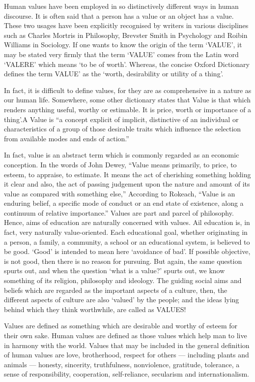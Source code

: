 Human values have been employed in so distinctively different ways in human discourse. It is
often said that a person has a value or an object has a value. These two usages have been
explicitly recognised by writers in various disciplines such as Charles Mortris in Philosophy,
Brevster Smith in Psychology and Roibin Williams in Sociology.
If one wants to know the origin of the term ‘VALUE’, it may be stated very firmly that the term
‘VALUE’ comes from the Latin word ‘VALERE’ which means ‘to be of worth’. Whereas, the
concise Oxford Dictionary defines the term VALUE’ as the ‘worth, desirability or utility of a
thing’.


In fact, it is difficult to define values, for they are as comprehensive in a nature as our human
life. Somewhere, some other dictionary states that Value is that which renders anything useful,
worthy or estimable. It is price, worth or importance of a thing’.A
Value is “a concept explicit of implicit, distinctive of an individual or characteristics of a group
of those desirable traits which influence the selection from available modes and ends of
action.”


In fact, value is an abstract term which is commonly regarded as an economic conception. In
the words of John Dewey, “Value means primarily, to price, to esteem, to appraise, to estimate.
It means the act of cherishing something holding it clear and also, the act of passing judgement
upon the nature and amount of its value as compared with something else,”
According to Rokeach, “Value is an enduring belief, a specific mode of conduct or an end state
of existence, along a continuum of relative importance.”
Values are part and parcel of philosophy. Hence, aims of education are naturally concerned
with values. Ail education is, in fact, very naturally value-oriented. Each educational goal,
whether originating in a person, a family, a community, a school or an educational system, is
believed to be good. ‘Good’ is intended to mean here ‘avoidance of bad’.
If possible objective, is not good, then there is no reason for pursuing. But again, the same
question spurts out, and when the question ‘what is a value?’ spurts out, we know something of its religion, philosophy and ideology.
The guiding social aims and beliefs which are regarded as the important aspects of a culture,
then, the different aspects of culture are also ‘valued’ by the people; and the ideas lying behind
which they think worthwhile, are called as VALUES!


Values are defined as something which are desirable and worthy of esteem for their own sake.
Human values are defined as those values which help man to live in harmony with the world.
Values that may be included in the general definition of human values are love, brotherhood,
respect for others — including plants and animals — honesty, sincerity, truthfulness, nonviolence, gratitude, tolerance, a sense of responsibility, cooperation, self-reliance, secularism and internationalism.
